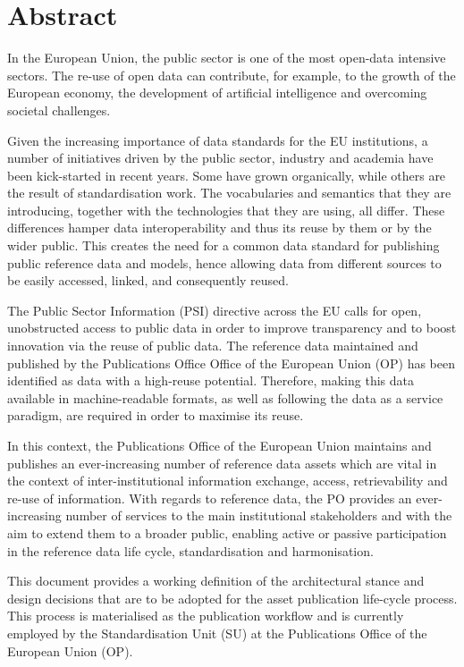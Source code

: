 \section*{Abstract}

    In the European Union, the public sector is one of the most open-data intensive sectors. The re-use of open data can contribute, for example, to the growth of the European economy, the development of artificial intelligence and overcoming societal challenges.

	Given the increasing importance of data standards for the EU institutions, a number of initiatives driven by the public sector, industry and academia have been kick-started in recent years. Some have grown organically, while others are the result of standardisation work. The vocabularies and semantics that they are introducing, together with the technologies that they are using, all differ. These differences hamper data interoperability and thus its reuse by them or by the wider public. This creates the need for a common data standard for publishing public reference data and models, hence allowing data from different sources to be easily accessed, linked, and consequently reused.
	
	The Public Sector Information (PSI) directive across the EU calls for open, unobstructed access to public data in order to improve transparency and to boost innovation via the reuse of public data. The reference data maintained and published by the Publications Office Office of the European Union (OP) has been identified as data with a high-reuse potential. Therefore, making this data available in machine-readable formats, as well as following the data as a service paradigm, are required in order to maximise its reuse.
	
	In this context, the Publications Office of the European Union maintains and publishes an ever-increasing number of reference data assets which are vital in the context of inter-institutional information exchange, access, retrievability and re-use of information. With regards to reference data, the PO provides an ever-increasing number of services to the main institutional stakeholders and with the aim to extend them to a broader public, enabling active or passive participation in the reference data life cycle, standardisation and harmonisation.
	
	This document provides a working definition of the architectural stance and design decisions that are to be adopted for the asset publication life-cycle process. This process is materialised as the publication workflow and is currently employed by the Standardisation Unit (SU) at the Publications Office of the European Union (OP).
	
